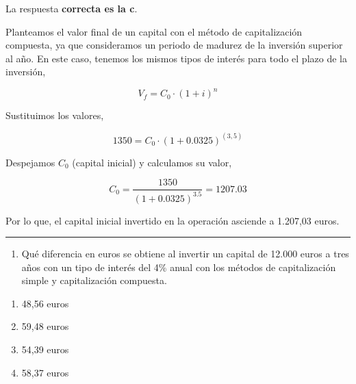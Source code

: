 \documentclass[
  letterpaper,
  DIV=11,
  numbers=noendperiod]{scrreprt}
\providecommand{\tightlist}{%
  \setlength{\itemsep}{0pt}\setlength{\parskip}{0pt}}\usepackage{longtable,booktabs,array}
\begin{document}
\begin{tcolorbox}[enhanced jigsaw, left=2mm, opacityback=0, colback=white, breakable, arc=.35mm, bottomrule=.15mm, rightrule=.15mm, toprule=.15mm, leftrule=.75mm, colframe=quarto-callout-tip-color-frame]
\begin{minipage}[t]{5.5mm}
\textcolor{quarto-callout-tip-color}{\faLightbulb}
\end{minipage}%
\begin{minipage}[t]{\textwidth - 5.5mm}

La respuesta \textbf{correcta es la c}.

Planteamos el valor final de un capital con el método de capitalización
compuesta, ya que consideramos un periodo de madurez de la inversión
superior al año. En este caso, tenemos los mismos tipos de interés para
todo el plazo de la inversión,

\[V_f=C_0\cdot\left(1+i\right)^n\]

Sustituimos los valores,

\[1350=C_0\cdot\left(1+0.0325\right)^{(3,5)}\]

Despejamos \(C_0\) (capital inicial) y calculamos su valor,

\[C_0=\frac{1350}{\left(1+0.0325\right)^{3.5}}=1207.03\]

Por lo que, el capital inicial invertido en la operación asciende a
1.207,03 euros.

\end{minipage}%
\end{tcolorbox}

\begin{center}\rule{0.5\linewidth}{0.5pt}\end{center}

\begin{enumerate}
\def\labelenumi{\arabic{enumi}.}
\setcounter{enumi}{10}
\tightlist
\item
  Qué diferencia en euros se obtiene al invertir un capital de 12.000
  euros a tres años con un tipo de interés del 4\% anual con los métodos
  de capitalización simple y capitalización compuesta.
\end{enumerate}

\begin{enumerate}
\def\labelenumi{\alph{enumi})}
\item
  48,56 euros
\item
  59,48 euros
\item
  54,39 euros
\item
  58,37 euros
\end{enumerate}
\end{document}
